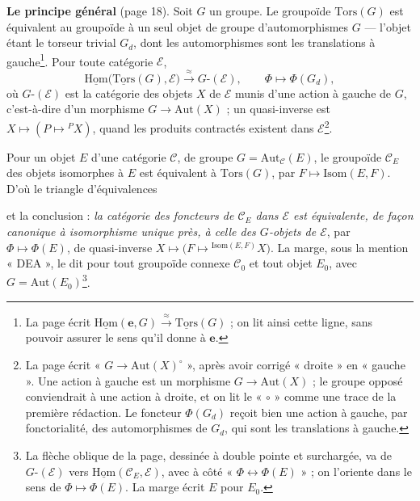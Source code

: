 \documentclass[11pt,a4paper]{article}
\begin{document}
\textbf{Le principe général} (page 18). Soit $G$ un groupe. Le groupoïde
$\mathrm{Tors}(G)$ est équivalent au groupoïde à un seul objet de groupe
d'automorphismes $G$ --- l'objet étant le torseur trivial $G_d$, dont les
automorphismes sont les translations à gauche\footnote{La page écrit
$\underline{\mathrm{Hom}}(\mathbf{e}, G) \overset{\approx}{\to}
\underline{\mathrm{Tors}}(G)$ ; on lit ainsi cette ligne, sans pouvoir assurer
le sens qu'il donne à $\mathbf{e}$.}. Pour toute catégorie $\mathcal{E}$,
\[
  \underline{\mathrm{Hom}}\bigl(\underline{\mathrm{Tors}}(G), \mathcal{E}\bigr)
  \xrightarrow{\ \approx\ } G\text{-}(\mathcal{E}), \qquad \Phi \longmapsto
  \Phi(G_d),
\]
où $G\text{-}(\mathcal{E})$ est la catégorie des objets $X$ de $\mathcal{E}$
munis d'une action à gauche de $G$, c'est-à-dire d'un morphisme $G \to
\mathrm{Aut}(X)$ ; un quasi-inverse est $X \mapsto (P \mapsto {}^{P}X)$, quand
les produits contractés existent dans $\mathcal{E}$\footnote{La page écrit
« $G \to \mathrm{Aut}(X)^{\circ}$ », après avoir corrigé « droite » en
« gauche ». Une action à gauche est un morphisme $G \to \mathrm{Aut}(X)$ ; le
groupe opposé conviendrait à une action à droite, et on lit le « $\circ$ »
comme une trace de la première rédaction. Le foncteur $\Phi(G_d)$ reçoit bien
une action à gauche, par fonctorialité, des automorphismes de $G_d$, qui sont
les translations à gauche.}.

Pour un objet $E$ d'une catégorie $\mathcal{C}$, de groupe $G =
\mathrm{Aut}_{\mathcal{C}}(E)$, le groupoïde $\mathcal{C}_E$ des objets
isomorphes à $E$ est équivalent à $\mathrm{Tors}(G)$, par $F \mapsto
\mathrm{Isom}(E, F)$. D'où le triangle d'équivalences


\noindent et la conclusion : \emph{la catégorie des foncteurs de
$\mathcal{C}_E$ dans $\mathcal{E}$ est équivalente, de façon canonique à
isomorphisme unique près, à celle des $G$-objets de $\mathcal{E}$}, par $\Phi
\mapsto \Phi(E)$, de quasi-inverse $X \mapsto \bigl(F \mapsto
{}^{\mathrm{Isom}(E, F)}X\bigr)$. La marge, sous la mention « DEA », le dit
pour tout groupoïde connexe $\mathcal{C}_0$ et tout objet $E_0$, avec $G =
\mathrm{Aut}(E_0)$\footnote{La flèche oblique de la page, dessinée à double
pointe et surchargée, va de $G\text{-}(\mathcal{E})$ vers
$\underline{\mathrm{Hom}}(\mathcal{C}_E, \mathcal{E})$, avec à côté « $\Phi
\leftrightarrow \Phi(E)$ » ; on l'oriente dans le sens de $\Phi \mapsto
\Phi(E)$. La marge écrit $E$ pour $E_0$.}.
\end{document}
